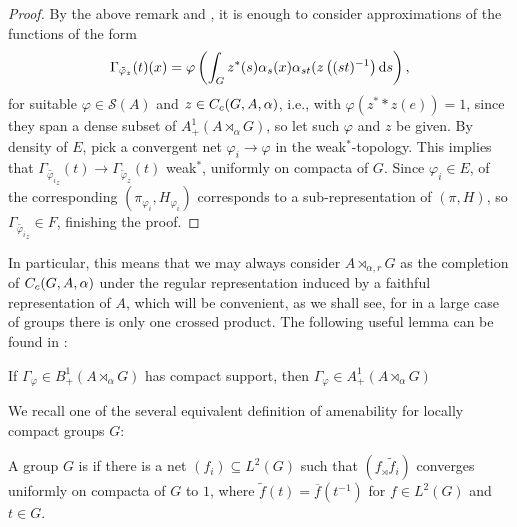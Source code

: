\begin{proof}
	By the above remark and , it is enough to consider approximations of the functions of the form
	\begin{align*}
		\Gamma_{\tilde \varphi_z}(t) (x) =\varphi\left( \int_G z^*(s) \alpha_s(x) \alpha_{st}(z\left( (st)^{-1} \right)\mathrm{d} s \right),
	\end{align*}
	for suitable $\varphi \in \mathcal{S}(A)$ and $z \in C_c(G,A,\alpha)$, i.e., with $\varphi(z^* \ast z(e)) = 1$, since they span a dense subset of $A_+^1(A \rtimes_\alpha G)$, so let such $\varphi$ and $z$ be given. By density of $E$, pick a convergent net $\varphi_i \to \varphi$ in the weak$^*$-topology. This implies that $\Gamma_{\tilde {\varphi_i}_z}(t) \to \Gamma_{\tilde \varphi_z}(t)$ weak$^*$, uniformly on compacta of $G$. Since $\varphi_i \in E$, of the corresponding $(\pi_{\varphi_i},H_{\varphi_i})$ corresponds to a sub-representation of $(\pi,H)$, so $\Gamma_{\tilde {\varphi_i}_z} \in F$, finishing the proof.
\end{proof}
In particular, this means that we may always consider $A \rtimes_{\alpha,r}G$ as the completion of $C_c(G,A,\alpha)$ under the regular representation induced by a faithful representation of $A$, which will be convenient, as we shall see, for in a large case of groups there is only one crossed product. The following useful lemma can be found in \cite[Lemma 7.7.6]{pedersenalgauto}:
\begin{lemma}
	If $\Gamma_\varphi \in B_+^1(A \rtimes_\alpha G)$ has compact support, then $\Gamma_\varphi \in A_+^1(A \rtimes_\alpha G)$
	\label{crossed:compactposdef}
\end{lemma}

We recall one of the several equivalent definition of amenability for locally compact groups $G$:
\begin{definition}
	A group $G$ is  if there is a net $(f_i) \subseteq L^2(G)$ such that $(f_ \rtimes \tilde f_i)$ converges uniformly on compacta of $G$ to $1$, where $\tilde f (t) = \overline f(t^{-1})$ for $f \in L^2(G)$ and $t \in G$.
\end{definition}


